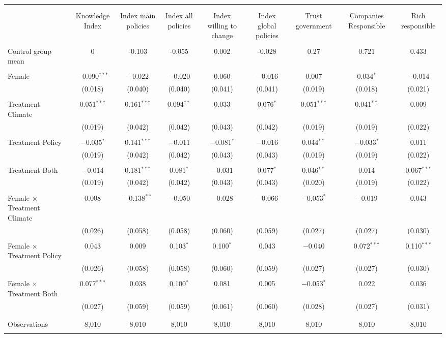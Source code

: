 
\begin{tabular}{@{\extracolsep{5pt}}lcccccccc} 
\\[-1.8ex]\hline 
\hline \\[-1.8ex] 
\\[-1.8ex] & Knowledge Index & Index main policies & Index all policies & Index willing to change & Index global policies & Trust government & Companies Responsible & Rich responsible \\ 
\hline \\[-1.8ex] 
 Control group mean & 0 & -0.103 & -0.055 & 0.002 & -0.028 & 0.27 & 0.721 & 0.433  \\ \hline \\[-1.8ex] Female & $-$0.090$^{***}$ & $-$0.022 & $-$0.020 & 0.060 & $-$0.016 & 0.007 & 0.034$^{*}$ & $-$0.014 \\ 
  & (0.018) & (0.040) & (0.040) & (0.041) & (0.041) & (0.019) & (0.018) & (0.021) \\ 
  & & & & & & & & \\ 
 Treatment Climate & 0.051$^{***}$ & 0.161$^{***}$ & 0.094$^{**}$ & 0.033 & 0.076$^{*}$ & 0.051$^{***}$ & 0.041$^{**}$ & 0.009 \\ 
  & (0.019) & (0.042) & (0.042) & (0.043) & (0.042) & (0.019) & (0.019) & (0.022) \\ 
  & & & & & & & & \\ 
 Treatment Policy & $-$0.035$^{*}$ & 0.141$^{***}$ & $-$0.011 & $-$0.081$^{*}$ & $-$0.016 & 0.044$^{**}$ & $-$0.033$^{*}$ & 0.011 \\ 
  & (0.019) & (0.042) & (0.042) & (0.043) & (0.043) & (0.019) & (0.019) & (0.022) \\ 
  & & & & & & & & \\ 
 Treatment Both & $-$0.014 & 0.181$^{***}$ & 0.081$^{*}$ & $-$0.031 & 0.077$^{*}$ & 0.046$^{**}$ & 0.014 & 0.067$^{***}$ \\ 
  & (0.019) & (0.042) & (0.042) & (0.043) & (0.043) & (0.020) & (0.019) & (0.022) \\ 
  & & & & & & & & \\ 
 Female $\times$ Treatment Climate & 0.008 & $-$0.138$^{**}$ & $-$0.050 & $-$0.028 & $-$0.066 & $-$0.053$^{*}$ & $-$0.019 & 0.043 \\ 
  & (0.026) & (0.058) & (0.058) & (0.060) & (0.059) & (0.027) & (0.027) & (0.030) \\ 
  & & & & & & & & \\ 
 Female $\times$ Treatment Policy & 0.043 & 0.009 & 0.103$^{*}$ & 0.100$^{*}$ & 0.043 & $-$0.040 & 0.072$^{***}$ & 0.110$^{***}$ \\ 
  & (0.026) & (0.058) & (0.058) & (0.060) & (0.059) & (0.027) & (0.027) & (0.030) \\ 
  & & & & & & & & \\ 
 Female $\times$ Treatment Both & 0.077$^{***}$ & 0.038 & 0.100$^{*}$ & 0.081 & 0.005 & $-$0.053$^{*}$ & 0.022 & 0.036 \\ 
  & (0.027) & (0.059) & (0.059) & (0.061) & (0.060) & (0.028) & (0.027) & (0.031) \\ 
  & & & & & & & & \\ 
\hline \\[-1.8ex] 

Observations & 8,010 & 8,010 & 8,010 & 8,010 & 8,010 & 8,010 & 8,010 & 8,010 \\ 
\hline 
\hline \\[-1.8ex] 
\end{tabular} 